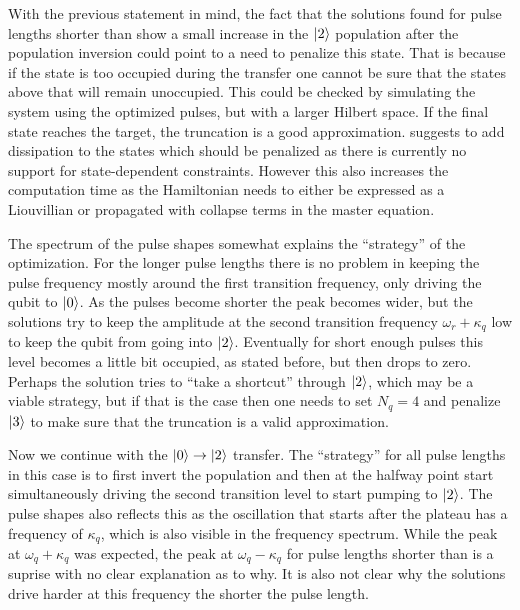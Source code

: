 \documentclass[main.tex]{subfiles}
\begin{document}
With the previous statement in mind, the fact that the solutions found for pulse lengths shorter than  show a small increase in the \(\ket{2}\) population after the population inversion could point to a need to penalize this state.
That is because if the state is too occupied during the transfer one cannot be sure that the states above that will remain unoccupied.
This could be checked by simulating the system using the optimized pulses, but with a larger Hilbert space.
If the final state reaches the target, the truncation is a good approximation.
\krotov{} suggests to add dissipation to the states which should be penalized as there is currently no support for state-dependent constraints.
However this also increases the computation time as the Hamiltonian needs to either be expressed as a Liouvillian or propagated with collapse terms in the master equation.

The spectrum of the pulse shapes somewhat explains the ``strategy'' of the optimization.
For the longer pulse lengths there is no problem in keeping the pulse frequency mostly around the first transition frequency, only driving the qubit to \(\ket{0}\).
As the pulses become shorter the peak becomes wider, but the solutions try to keep the amplitude at the second transition frequency \(\omega_r+\kappa_q\) low to keep the qubit from going into \(\ket{2}\).
Eventually for short enough pulses this level becomes a little bit occupied, as stated before, but then drops to zero.
Perhaps the solution tries to ``take a shortcut'' through \(\ket{2}\), which may be a viable strategy, but if that is the case then one needs to set \(N_q = 4\) and penalize \(\ket{3}\) to make sure that the truncation is a valid approximation.

Now we continue with the \(\ket{0}\rightarrow\ket{2}\) transfer.
The ``strategy'' for all pulse lengths in this case is to first invert the population and then at the halfway point start simultaneously driving the second transition level to start pumping to \(\ket{2}\).
The pulse shapes also reflects this as the oscillation that starts after the plateau has a frequency of \(\kappa_q\), which is also visible in the frequency spectrum.
While the peak at \(\omega_q+\kappa_q\) was expected, the peak at \(\omega_q-\kappa_q\) for pulse lengths shorter than  is a suprise with no clear explanation as to why.
It is also not clear why the solutions drive harder at this frequency the shorter the pulse length.
\end{document}
